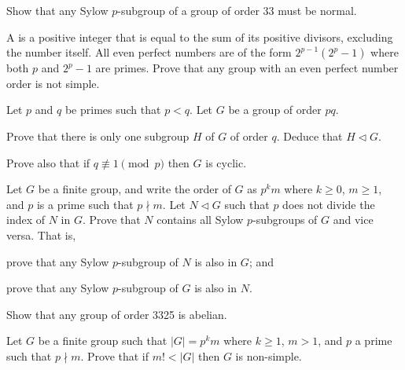 \begin{problem}
    Show that any Sylow $p$-subgroup of a group of order 33 must be normal.
\end{problem}

\begin{problem}
    A  is a positive integer that is equal to the sum of its positive divisors, excluding the number itself. All even perfect numbers are of the form $2^{p-1}\left(2^p-1\right)$ where both $p$ and $2^p-1$ are primes. Prove that any group with an even perfect number order is not simple.
\end{problem}

\begin{problem}\label{problem-group-of-order-pq-has-normal-subgroup-of-order-q}
    Let $p$ and $q$ be primes such that $p < q$. Let $G$ be a group of order $pq$.
    \begin{partquestions}{\roman*}
        \item Prove that there is only one subgroup $H$ of $G$ of order $q$. Deduce that $H \lhd G$.
        \item Prove also that if $q \not\equiv 1 \pmod p$ then $G$ is cyclic.
    \end{partquestions}
\end{problem}

\begin{problem}\label{problem-normal-subgroup-of-G-contains-all-sylow-p-subgroups}
    Let $G$ be a finite group, and write the order of $G$ as $p^km$ where $k \geq 0$, $m \geq 1$, and $p$ is a prime such that $p \nmid m$. Let $N \lhd G$ such that $p$ does not divide the index of $N$ in $G$. Prove that $N$ contains all Sylow $p$-subgroups of $G$ and vice versa. That is,
    \begin{partquestions}{\roman*}
        \item prove that any Sylow $p$-subgroup of $N$ is also in $G$; and
        \item prove that any Sylow $p$-subgroup of $G$ is also in $N$.
    \end{partquestions}
\end{problem}

\begin{problem}
    Show that any group of order 3325 is abelian.
\end{problem}

\begin{problem}\label{problem-if-m!<|G|-then-G-is-simple}
    Let $G$ be a finite group such that $|G| = p^km$ where $k \geq 1$, $m > 1$, and $p$ a prime such that $p \nmid m$. Prove that if $m! < |G|$ then $G$ is non-simple.
\end{problem}

